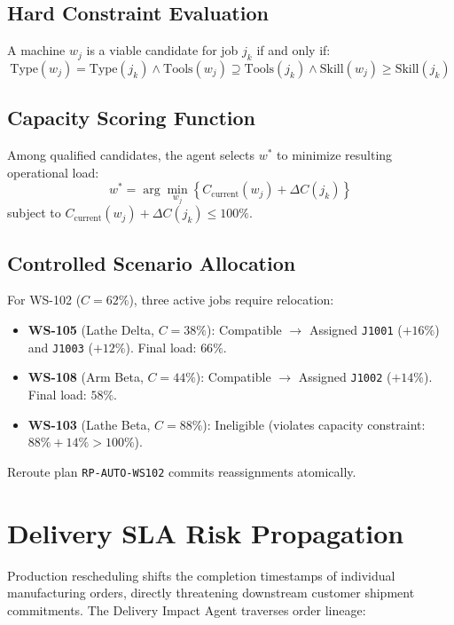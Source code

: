 \documentclass[10pt,twocolumn,a4paper]{article}
\begin{document}
\subsection{Hard Constraint Evaluation}
A machine $w_j$ is a viable candidate for job $j_k$ if and only if:
\begin{equation}
    \text{Type}(w_j) = \text{Type}(j_k) \land \text{Tools}(w_j) \supseteq \text{Tools}(j_k) \land \text{Skill}(w_j) \ge \text{Skill}(j_k)
\end{equation}

\subsection{Capacity Scoring Function}
Among qualified candidates, the agent selects $w^*$ to minimize resulting operational load:
\begin{equation}
    w^* = \arg\min_{w_j} \left\{ C_{\text{current}}(w_j) + \Delta C(j_k) \right\}
\end{equation}
subject to $C_{\text{current}}(w_j) + \Delta C(j_k) \le 100\%$.

\subsection{Controlled Scenario Allocation}
For WS-102 ($C=62\%$), three active jobs require relocation:
\begin{itemize}
    \item \textbf{WS-105} (Lathe Delta, $C=38\%$): Compatible $\to$ Assigned \texttt{J1001} ($+16\%$) and \texttt{J1003} ($+12\%$). Final load: $66\%$.
    \item \textbf{WS-108} (Arm Beta, $C=44\%$): Compatible $\to$ Assigned \texttt{J1002} ($+14\%$). Final load: $58\%$.
    \item \textbf{WS-103} (Lathe Beta, $C=88\%$): Ineligible (violates capacity constraint: $88\% + 14\% > 100\%$).
\end{itemize}
Reroute plan \texttt{RP-AUTO-WS102} commits reassignments atomically.

\section{Delivery SLA Risk Propagation}
\label{sec:delivery_impact}
Production rescheduling shifts the completion timestamps of individual manufacturing orders, directly threatening downstream customer shipment commitments. The Delivery Impact Agent traverses order lineage:
\end{document}
